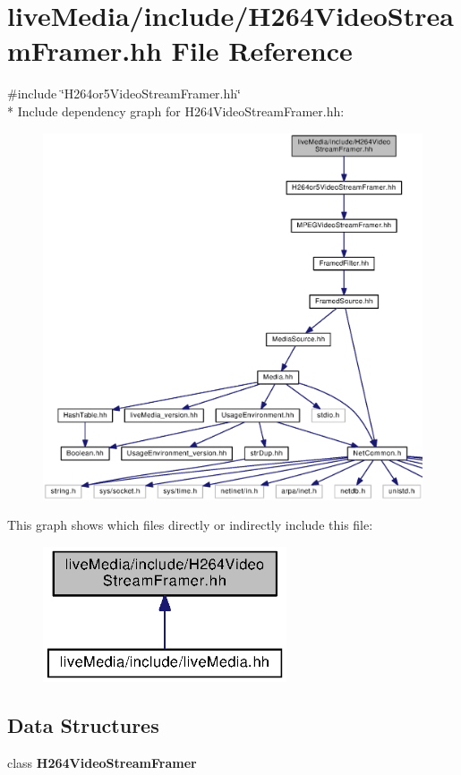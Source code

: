 \section{live\+Media/include/\+H264\+Video\+Stream\+Framer.hh File Reference}
\label{H264VideoStreamFramer_8hh}
{\ttfamily \#include \char`\"{}H264or5\+Video\+Stream\+Framer.\+hh\char`\"{}}\\*
Include dependency graph for H264\+Video\+Stream\+Framer.\+hh\+:
\nopagebreak
\begin{figure}[H]
\begin{center}
\leavevmode
\includegraphics[width=350pt]{H264VideoStreamFramer_8hh__incl}
\end{center}
\end{figure}
This graph shows which files directly or indirectly include this file\+:
\nopagebreak
\begin{figure}[H]
\begin{center}
\leavevmode
\includegraphics[width=204pt]{H264VideoStreamFramer_8hh__dep__incl}
\end{center}
\end{figure}
\subsection*{Data Structures}
\begin{DoxyCompactItemize}
\item 
class {\bf H264\+Video\+Stream\+Framer}
\end{DoxyCompactItemize}
